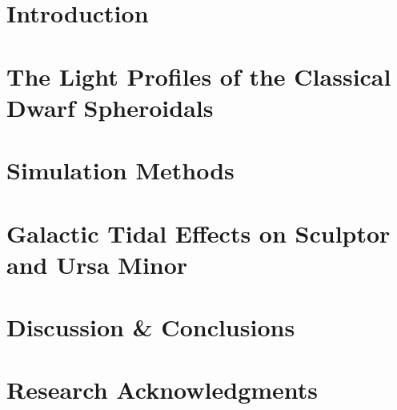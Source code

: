 \documentclass[12pt,oneside,letterpaper]{report}
\begin{document}
\newpage
{}





\chapter{Introduction}\label{sec:introduction}



\chapter{The Light Profiles of the Classical Dwarf Spheroidals}\label{sec:observations}


\chapter{Simulation Methods}\label{sec:methods}


\chapter{Galactic Tidal Effects on Sculptor and Ursa Minor}\label{sec:results}


\chapter{Discussion \& Conclusions}\label{sec:discussion}



\chapter*{Research Acknowledgments}






\newpage

 



\appendix





\end{document}
